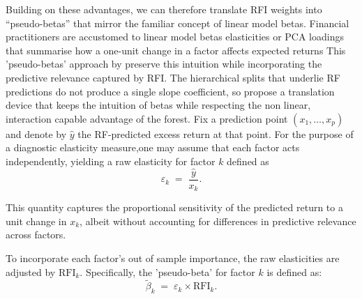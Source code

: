 Building on these advantages, we can therefore translate RFI weights into “pseudo-betas” that mirror the familiar concept of linear model betas. Financial practitioners are accustomed to linear model betas elasticities or PCA loadings that summarise how a one-unit change in a factor affects expected returns This 'pseudo-betas' approach by  preserve this intuition while incorporating the predictive relevance captured by RFI.  The hierarchical splits that underlie RF predictions do not produce a single slope coefficient, so  propose a translation device that keeps the intuition of betas while respecting the non linear, interaction capable advantage of the forest. Fix a prediction point \((x_{1},\dots,x_{p})\) and denote by \(\hat{y}\) the RF-predicted excess return at that point.  For the purpose of a diagnostic elasticity measure,one may assume that each factor acts independently, yielding a raw elasticity for factor \(k\) defined as
\begin{equation}
    \varepsilon_{k} \;=\; \frac{\hat{y}}{x_{k}}.
\end{equation}

This quantity captures the proportional sensitivity of the predicted return to a unit change in \(x_{k}\), albeit without accounting for differences in predictive relevance across factors.

To incorporate each factor's out of sample importance, the raw elasticities are adjusted by \(\mathrm{RFI}_{k}\). Specifically, the 'pseudo-beta' for factor \(k\) is defined as:
\begin{equation}
\tilde{\beta}_{k} \;=\; \varepsilon_{k} \times \mathrm{RFI}_{k}.    
\end{equation}



